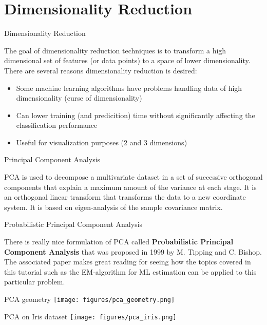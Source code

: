 \documentclass[12pt]{beamer}
\begin{document}
\section{Dimensionality Reduction} 

\begin{frame}{Dimensionality Reduction}

The goal of dimensionality reduction techniques is to transform a high
dimensional set of features (or data points) to a space of lower
dimensionality. There are several reasons dimensionality reduction is
desired:
\begin{itemize} 
\item{Some machine learning algorithms have problems handling data of high dimensionality (curse of dimensionality)}
\item{Can lower training (and predicition) time without significantly affecting the classification performance} 
\item{Useful for visualization purposes (2 and 3 dimensions)} 
\end{itemize} 
\end{frame}

\begin{frame}{Principal Component Analysis} 

PCA is used to decompose a multivariate dataset in a set of successive
orthogonal components that explain a maximum amount of the variance at
each stage.  It is an orthogonal linear transform that transforms the
data to a new coordinate system.  It is based on eigen-analysis of the
sample covariance matrix.
\end{frame}

\begin{frame}{Probabilistic Principal Component Analysis} 
  
There is really nice formulation of PCA called {\bf Probabilistic
  Principal Component Analysis} that was proposed in 1999 by
M. Tipping and C. Bishop. The associated paper makes great reading for
seeing how the topics covered in this tutorial such as the
EM-algorithm for ML estimation can be applied to this particular
problem.

\end{frame}

\begin{frame}{PCA geometry} 
\texttt{[image: figures/pca\_geometry.png]}
\end{frame} 

\begin{frame}{PCA on Iris dataset}
\texttt{[image: figures/pca\_iris.png]}
\end{frame}
\end{document}

